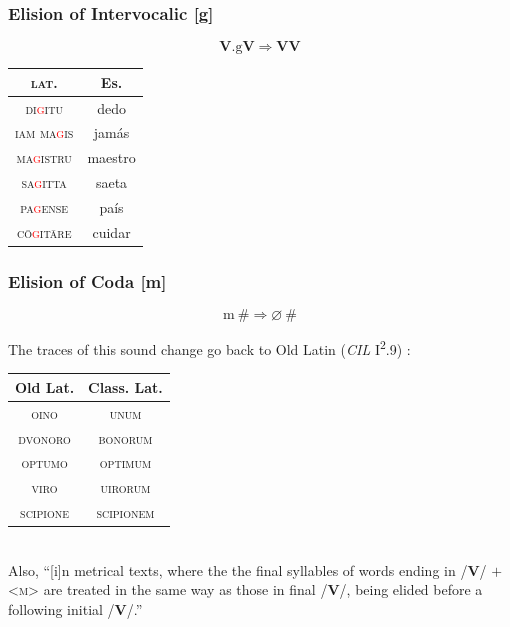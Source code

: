 \documentclass{report}[12pt]
\begin{document}
\subsubsection*{Elision of Intervocalic [g]}

\begin{tcolorbox}
  \[ \textbf{V}.\text{g}\textbf{V} \Rightarrow \textbf{V}\textbf{V} \]
\end{tcolorbox}

\begin{tabular}{c c}
  \textsc{lat.} & Es. \\
  \hline
  \textsc{di\textcolor{red}{g}itu} & dedo \\
  \textsc{iam ma\textcolor{red}{g}is} & jamás \\
  \textsc{ma\textcolor{red}{g}istru} & maestro \\
  \textsc{sa\textcolor{red}{g}itta} & saeta \\
  \textsc{pa\textcolor{red}{g}ense} & país \\
  \textsc{c\={o}\textcolor{red}{g}it\={a}re} & cuidar \\
\end{tabular}

\subsubsection*{Elision of Coda [m]}

\begin{tcolorbox}
  \[ \text{m}\ \# \Rightarrow \varnothing\ \# \]
\end{tcolorbox}

The traces of this sound change go back to Old Latin (\emph{CIL} I\textsuperscript{2}.9) \parencite[p.~17]{companion_to_latin}: \\
\begin{tabular}{c c}
  Old Lat. & Class. Lat. \\
  \hline
  \textsc{oino} & \textsc{unum} \\
  \textsc{dvonoro} & \textsc{bonorum} \\
  \textsc{optumo} & \textsc{optimum} \\
  \textsc{viro} & \textsc{uirorum} \\
  \textsc{scipione} & \textsc{scipionem} \\
\end{tabular} \\
Also, ``[i]n metrical texts, where the the final syllables of words ending in /\textbf{V}/ $+$ <\textsc{m}> are treated in the same way as those in final /\textbf{V}/, being elided before a following initial /\textbf{V}/.'' \parencite[p.~87]{companion_to_latin}
\end{document}
